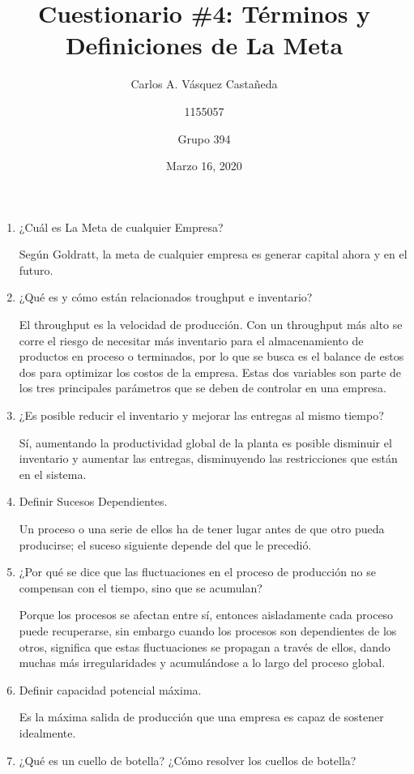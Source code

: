 \documentclass[12pt, letterpaper]{article}
\title{Cuestionario \#4: Términos y Definiciones de La Meta}
\author{Carlos A. Vásquez Castañeda \and 1155057 \and Grupo 394}
\date{Marzo 16, 2020}
\begin{document}
\maketitle

\begin{enumerate}
	\item ¿Cuál es La Meta de cualquier Empresa?

		Según Goldratt, la meta de cualquier empresa es generar capital ahora y en el futuro.

	\item ¿Qué es y cómo están relacionados troughput e inventario?

		El throughput es la velocidad de producción. Con un throughput más alto se corre el riesgo de necesitar más inventario para el almacenamiento de productos en proceso o terminados, por lo que se busca es el balance de estos dos para optimizar los costos de la empresa. Estas dos variables son parte de los tres principales parámetros que se deben de controlar en una empresa.

	\item ¿Es posible reducir el inventario y mejorar las entregas al mismo tiempo?

		Sí, aumentando la productividad global de la planta es posible disminuir el inventario y aumentar las entregas, disminuyendo las restricciones que están en el sistema.

	\item Definir Sucesos Dependientes.

		Un proceso o una serie de ellos ha de tener lugar antes de que otro pueda producirse; el suceso siguiente depende del que le precedió.

	\item ¿Por qué se dice que las fluctuaciones en el proceso de producción no se compensan con el tiempo, sino que se acumulan?

		Porque los procesos se afectan entre sí, entonces aisladamente cada proceso puede recuperarse, sin embargo cuando los procesos son dependientes de los otros, significa que estas fluctuaciones se propagan a través de ellos, dando muchas más irregularidades y acumulándose a lo largo del proceso global.

	\item Definir capacidad potencial máxima.

		Es la máxima salida de producción que una empresa es capaz de sostener idealmente.

	\item ¿Qué es un cuello de botella? ¿Cómo resolver los cuellos de botella?


\end{enumerate}
\end{document}
